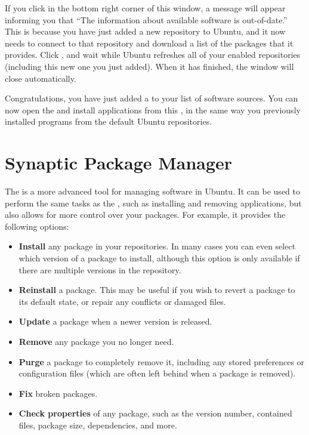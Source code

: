 If you click  in the bottom right corner of this window, a message will appear informing you that ``The information about available software is out-of-date.'' This is because you have just added a new repository to Ubuntu, and it now needs to connect to that repository and download a list of the packages that it provides. Click , and wait while Ubuntu refreshes all of your enabled repositories (including this new one you just added). When it has finished, the window will close automatically.

Congratulations, you have just added a  to your list of software sources. You can now open the  and install applications from this , in the same way you previously installed programs from the default Ubuntu repositories. 

\section{Synaptic Package Manager}
\label{sec:synaptic}

The  is a more advanced tool for managing software in Ubuntu. It can be used to perform the same tasks as the , such as installing and removing applications, but also allows for more control over your packages. For example, it provides the following options:

\begin{itemize}
	\item \textbf{Install} any package in your repositories. In many cases you can even select which version of a package to install, although this option is only available if there are multiple versions in the repository.
	\item \textbf{Reinstall} a package. This may be useful if you wish to revert a package to its default state, or repair any conflicts or damaged files.
	\item \textbf{Update} a package when a newer version is released.
	\item \textbf{Remove} any package you no longer need.
	\item \textbf{Purge} a package to completely remove it, including any stored preferences or configuration files (which are often left behind when a package is removed).
	\item \textbf{Fix} broken packages.
	\item \textbf{Check properties} of any package, such as the version number, contained files, package size, dependencies, and more.
\end{itemize}

